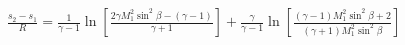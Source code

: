 \documentclass[10pt]{article}
\begin{document}
\begin{align*}\frac{s_{2}-s_{1}}{R}
=
\frac{1}{\gamma-1} 
\ln 
\left[ 
\frac{2 \gamma M_{1}^{2} \sin^2 \beta - \left( \gamma -1 \right) }{\gamma + 1}
\right]
+
\frac{\gamma}{\gamma-1}
\ln 
\left[ 
\frac{ \left( \gamma -1 \right) M_{1}^{2} \sin^2 \beta + 2 }{ \left( \gamma + 1 \right) M_{1}^{2} \sin^2 \beta }
\right]\end{align*}
\end{document}
